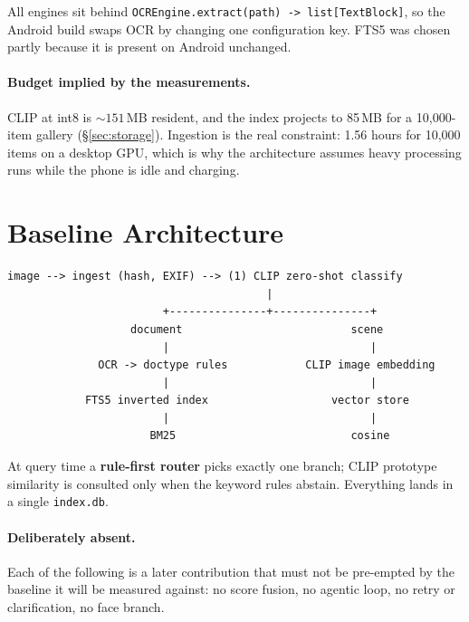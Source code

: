 \documentclass[11pt,a4paper]{article}
\newcommand{\code}[1]{\texttt{\small #1}}
\begin{document}
All engines sit behind \code{OCREngine.extract(path) -> list[TextBlock]}, so the
Android build swaps OCR by changing one configuration key. FTS5 was chosen partly
because it is present on Android unchanged.

\paragraph{Budget implied by the measurements.}
CLIP at int8 is ${\sim}151$\,MB resident, and the index projects to 85\,MB for a
10{,}000-item gallery (\S\ref{sec:storage}). Ingestion is the real constraint:
1.56 hours for 10{,}000 items on a desktop GPU, which is why the architecture
assumes heavy processing runs while the phone is idle and charging.

\section{Baseline Architecture}

\begin{center}
\begin{BVerbatim}
image --> ingest (hash, EXIF) --> (1) CLIP zero-shot classify
                                        |
                        +---------------+---------------+
                   document                          scene
                        |                               |
              OCR -> doctype rules            CLIP image embedding
                        |                               |
            FTS5 inverted index                   vector store
                        |                               |
                      BM25                           cosine
\end{BVerbatim}
\end{center}

At query time a \textbf{rule-first router} picks exactly one branch; CLIP
prototype similarity is consulted only when the keyword rules abstain. Everything
lands in a single \code{index.db}.

\paragraph{Deliberately absent.}
Each of the following is a later contribution that must not be pre-empted by the
baseline it will be measured against: no score fusion, no agentic loop, no retry
or clarification, no face branch.
\end{document}

